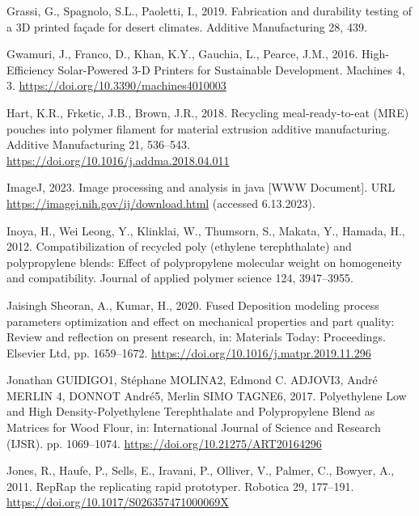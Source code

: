 \documentclass[
  12pt,
  number,
  review]{elsarticle}
\newlength{\cslhangindent}
\newlength{\cslentryspacingunit} %
\newenvironment{CSLReferences}[2] %
 {%
  \setlength{\parindent}{0pt}
  \ifodd #1
  \let\oldpar\par
  \def\par{\hangindent=\cslhangindent\oldpar}
  \fi
  \setlength{\parskip}{#2\cslentryspacingunit}
 }%
 {}
\begin{document}
\begin{CSLReferences}{1}{0}
\leavevmode{}%
Grassi, G., Spagnolo, S.L., Paoletti, I., 2019. Fabrication and
durability testing of a {3D} printed façade for desert climates.
Additive Manufacturing 28, 439.

\leavevmode{}%
Gwamuri, J., Franco, D., Khan, K.Y., Gauchia, L., Pearce, J.M., 2016.
High-{Efficiency Solar-Powered} 3-{D Printers} for {Sustainable
Development}. Machines 4, 3.
\url{https://doi.org/10.3390/machines4010003}

\leavevmode{}%
Hart, K.R., Frketic, J.B., Brown, J.R., 2018. Recycling
meal-ready-to-eat ({MRE}) pouches into polymer filament for material
extrusion additive manufacturing. Additive Manufacturing 21, 536--543.
\url{https://doi.org/10.1016/j.addma.2018.04.011}

\leavevmode{}%
ImageJ, 2023. Image processing and analysis in java {[}WWW Document{]}.
URL \url{https://imagej.nih.gov/ij/download.html} (accessed 6.13.2023).

\leavevmode{}%
Inoya, H., Wei Leong, Y., Klinklai, W., Thumsorn, S., Makata, Y.,
Hamada, H., 2012. Compatibilization of recycled poly (ethylene
terephthalate) and polypropylene blends: Effect of polypropylene
molecular weight on homogeneity and compatibility. Journal of applied
polymer science 124, 3947--3955.

\leavevmode{}%
Jaisingh Sheoran, A., Kumar, H., 2020. Fused {Deposition} modeling
process parameters optimization and effect on mechanical properties and
part quality: {Review} and reflection on present research, in: Materials
{Today}: {Proceedings}. {Elsevier Ltd}, pp. 1659--1672.
\url{https://doi.org/10.1016/j.matpr.2019.11.296}

\leavevmode{}%
Jonathan GUIDIGO1, Stéphane MOLINA2, Edmond C. ADJOVI3, André MERLIN 4,
DONNOT André5, Merlin SIMO TAGNE6, 2017. Polyethylene {Low} and {High
Density-Polyethylene Terephthalate} and {Polypropylene Blend} as
{Matrices} for {Wood Flour}, in: International {Journal} of {Science}
and {Research} ({IJSR}). pp. 1069--1074.
\url{https://doi.org/10.21275/ART20164296}

\leavevmode{}%
Jones, R., Haufe, P., Sells, E., Iravani, P., Olliver, V., Palmer, C.,
Bowyer, A., 2011. {RepRap} \textendash{} the replicating rapid
prototyper. Robotica 29, 177--191.
\url{https://doi.org/10.1017/S026357471000069X}


\end{CSLReferences}
\end{document}
